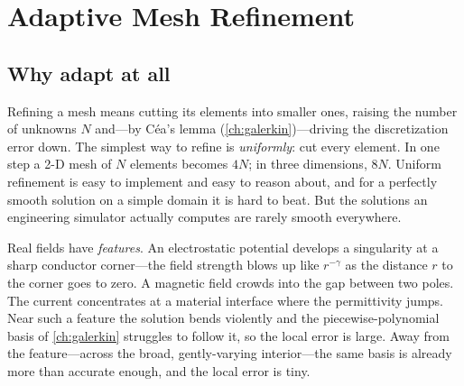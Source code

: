\chapter{Adaptive Mesh Refinement}
\label{ch:amr}


\section{Why adapt at all}
\label{sec:why-adapt}

Refining a mesh means cutting its elements into smaller ones, raising the number of
unknowns $N$ and---by C\'ea's lemma (\cref{ch:galerkin})---driving the discretization
error down. The simplest way to refine is \emph{uniformly}: cut every element. In
one step a 2-D mesh of $N$ elements becomes $4N$; in three dimensions, $8N$. Uniform
refinement is easy to implement and easy to reason about, and for a perfectly smooth
solution on a simple domain it is hard to beat. But the solutions an engineering
simulator actually computes are rarely smooth everywhere.

Real fields have \emph{features}. An electrostatic potential develops a singularity
at a sharp conductor corner---the field strength blows up like $r^{-\gamma}$ as the
distance $r$ to the corner goes to zero. A magnetic field crowds into the gap between
two poles. The current concentrates at a material interface where the permittivity
jumps. Near such a feature the solution bends violently and the piecewise-polynomial
basis of \cref{ch:galerkin} struggles to follow it, so the local error is large.
Away from the feature---across the broad, gently-varying interior---the same basis is
already more than accurate enough, and the local error is tiny.

